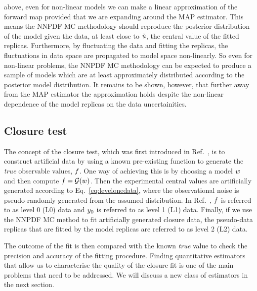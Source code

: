 above, even for non-linear models we can make a linear approximation of the
forward map provided that we are expanding around the MAP estimator. This means
the NNPDF MC methodology should reproduce the posterior distribution of the
model given the data, at least close to $\tilde{u}$, the central value of
the fitted replicas. Furthermore, by fluctuating the data and fitting the
replicas, the fluctuations in data space are propagated to model space
non-linearly. So even for non-linear problems, the NNPDF MC methodology can be
expected to produce a sample of models which are at least approximately
distributed according to the posterior model distribution. It remains to be
shown, however, that further away from the MAP estimator the approximation holds
despite the non-linear dependence of the model replicas on the data
uncertainities.

\subsection{Closure test}
\label{sec:closure-test-intro}

The concept of the closure test, which was first introduced in
Ref.~\cite{nnpdf30}, is to construct artificial data by using a known
pre-existing function to generate the {\em true} observable values, $f$. One
way of achieving this is by choosing a model $w$ and then compute $f
= \mathcal{G}(w)$. Then the experimental central values are artificially
generated according to Eq.~\ref{eq:levelonedata}, where the observational noise
is pseudo-randomly generated from the assumed distribution. In
Ref.~\cite{nnpdf30}, $f$ is referred to as level 0 (L0) data and
$y_0$ is referred to as level 1 (L1) data. Finally, if we use the
NNPDF MC method to fit artificially generated closure data, the pseudo-data
replicas that are fitted by the model replicas are referred to as level 2 (L2)
data.

The outcome of the fit is then compared with the known {\em true} value to check
the precision and accuracy of the fitting procedure. Finding quantitative
estimators that allow us to characterise the quality of the closure fit is one
of the main problems that need to be addressed. We will discuss a new class of
estimators in the next section. 

